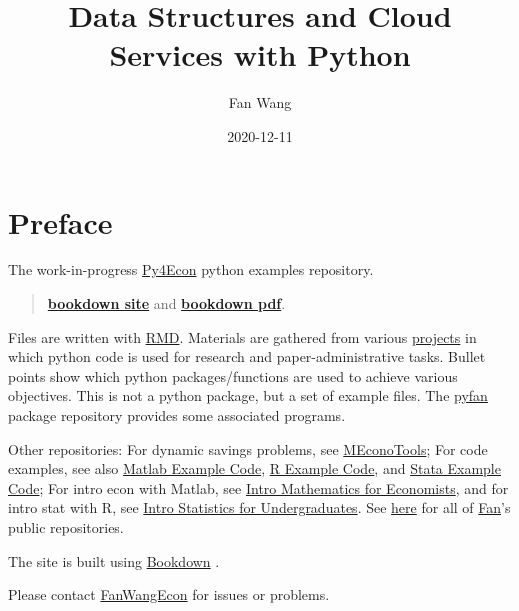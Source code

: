 \documentclass[
]{book}
\title{Data Structures and Cloud Services with Python}
\author{Fan Wang}
\date{2020-12-11}
\begin{document}
\maketitle

{
\hypersetup{linkcolor=}
\setcounter{tocdepth}{2}
\tableofcontents
}
\hypertarget{preface}{%
\chapter*{Preface}\label{preface}}

The work-in-progress \href{https://github.com/FanWangEcon/Py4Econ}{Py4Econ} python examples repository.

\begin{quote}
\href{https://fanwangecon.github.io/Py4Econ/bookdown}{\textbf{bookdown site}} and \href{https://fanwangecon.github.io/Py4Econ/bookdown/Data-Structures-and-Cloud-Services-with-Python.pdf}{\textbf{bookdown pdf}}.
\end{quote}

Files are written with \href{https://rmarkdown.rstudio.com/}{RMD}. Materials are gathered from various \href{https://fanwangecon.github.io/research}{projects} in which python code is used for research and paper-administrative tasks. Bullet points show which python packages/functions are used to achieve various objectives. This is not a python package, but a set of example files. The \href{https://pyfan.readthedocs.io/en/latest/}{pyfan} package repository provides some associated programs.

Other repositories: For dynamic savings problems, see \href{https://fanwangecon.github.io/MEconTools/}{MEconoTools}; For code examples, see also \href{https://fanwangecon.github.io/M4Econ/}{Matlab Example Code}, \href{https://fanwangecon.github.io/R4Econ/}{R Example Code}, and \href{https://fanwangecon.github.io/Stata4Econ/}{Stata Example Code}; For intro econ with Matlab, see \href{https://fanwangecon.github.io/Math4Econ/}{Intro Mathematics for Economists}, and for intro stat with R, see \href{https://fanwangecon.github.io/Stat4Econ/}{Intro Statistics for Undergraduates}. See \href{https://github.com/FanWangEcon}{here} for all of \href{https://fanwangecon.github.io/}{Fan}'s public repositories.

The site is built using \href{https://bookdown.org/}{Bookdown} \citep{R-bookdown}.

Please contact \href{https://fanwangecon.github.io/}{FanWangEcon} for issues or problems.
\end{document}
